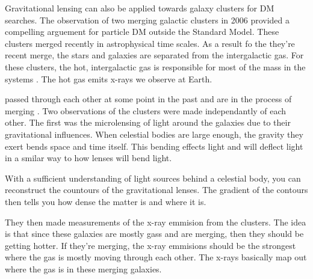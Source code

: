 \begin{figure}[ht]
\end{figure}

Gravitational lensing can also be applied towards galaxy clusters for DM searches.
The observation of two merging galactic clusters in 2006 provided a compelling arguement for particle DM outside the Standard Model.
These clusters merged recently in astrophysical time scales.
As a result fo the they're recent merge, the stars and galaxies are separated from the intergalactic gas.
For these clusters, the hot, intergalactic gas is responsible for most of the mass in the systems \cite{Hooper:DMHistory}.
The hot gas emits x-rays we observe at Earth.

passed through each other at some point in the past and are in the process of merging \ns.
Two observations of the clusters were made independantly of each other.
The first was the microlensing of light around the galaxies due to their gravitational influences.
When celestial bodies are large enough, the gravity they exert bends space and time itself.
This bending effects light and will deflect light in a smilar way to how lenses will bend light.


With a sufficient understanding of light sources behind a celestial body, you can reconstruct the countours of the gravitational lenses.
The gradient of the contours then tells you how dense the matter is and where it is.

They then made measurements of the x-ray emmision from the clusters.
The idea is that since these galaxies are mostly gass and are merging, then they should be getting hotter.
If they're merging, the x-ray emmisions should be the strongest where the gas is mostly moving through each other.
The x-rays basically map out where the gas is in these merging galaxies.


